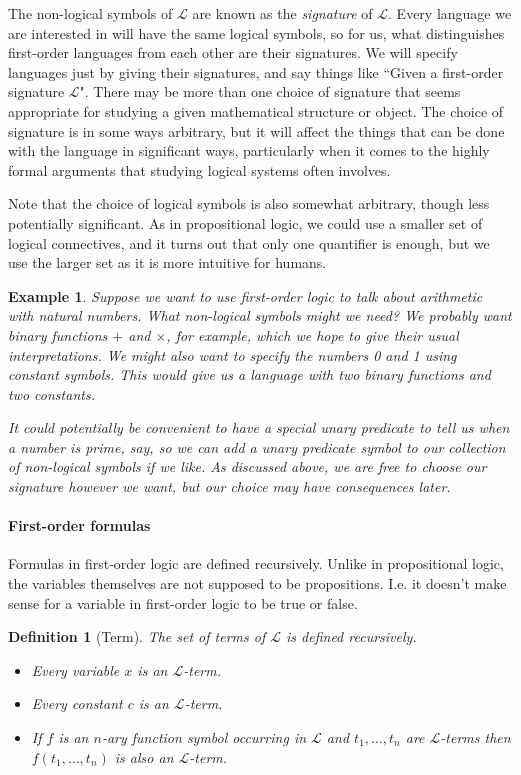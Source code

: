 \documentclass{article}
\theoremstyle{plain}
\newtheorem{definition}[theorem]{Definition}{\bfseries}{\upshape}
\newtheorem{example}[theorem]{Example}{\bfseries}{\upshape}
\newcommand{\sL}{\mathscr{L}}
\begin{document}
The non-logical symbols of $\sL$ are known as the \emph{signature} of $\sL$. Every language we are interested in will have the same logical symbols, so for us, what distinguishes first-order languages from each other are their signatures. We will specify languages just by giving their signatures, and say things like ``Given a first-order signature $\sL$". There may be more than one choice of signature that seems appropriate for studying a given mathematical structure or object. The choice of signature is in some ways arbitrary, but it will affect the things that can be done with the language in significant ways, particularly when it comes to the highly formal arguments that studying logical systems often involves.    

Note that the choice of logical symbols is also somewhat arbitrary, though less potentially significant. As in propositional logic, we could use a smaller set of logical connectives, and it turns out that only one quantifier is enough, but we use the larger set as it is more intuitive for humans.

\begin{example}
Suppose we want to use first-order logic to talk about arithmetic with natural numbers. What non-logical symbols might we need? We probably want binary functions $+$ and $\times$, for example, which we hope to give their usual interpretations. We might also want to specify the numbers 0 and 1 using constant symbols. This would give us a language with two binary functions and two constants. 

It could potentially be convenient to have a special unary predicate to tell us when a number is prime, say, so we can add a unary predicate symbol to our collection of non-logical symbols if we like. As discussed above, we are free to choose our signature however we want, but our choice may have consequences later. 
\end{example}

\paragraph{First-order formulas}
Formulas in first-order logic are defined recursively. Unlike in propositional logic, the variables themselves are not supposed to be propositions. I.e. it doesn't make sense for a variable in first-order logic to be true or false.

\begin{definition}[Term]
The set of \emph{terms} of $\sL$ is defined recursively.
\begin{itemize}
\item Every variable $x$ is an $\sL$-term.
\item Every constant $c$ is an $\sL$-term.
\item If $f$ is an $n$-ary function symbol occurring in $\sL$ and $t_1,\ldots,t_n$ are $\sL$-terms then $f(t_1,\ldots,t_n)$ is also an $\sL$-term.
\end{itemize}
\end{definition}
\end{document}
